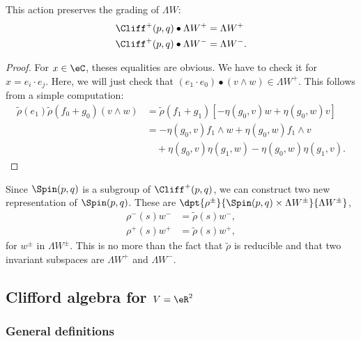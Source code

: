 \begin{proposition}
This action preserves the grading of $\Lambda W $:
\begin{equation}
\begin{split}
 \Cliff^+(p,q)\bullet\Lambda W^+&=\Lambda W^+\\
 \Cliff^+(p,q)\bullet\Lambda W^-&=\Lambda W^-.
\end{split}
\end{equation}

\end{proposition}
\begin{proof}
For $x\in\eC$, theses equalities are obvious. We have to check it for $x=e_i\cdot e_j$. Here, we will just check that $(e_1\cdot e_0)\bullet(v\wedge w)\in\Lambda W^+$. This follows from a simple computation:
\begin{equation}
\begin{split}
\tilde\rho(e_1)\tilde\rho(f_0+g_0)(v\wedge w)&=
                         \tilde\rho(f_1+g_1)\left[-\eta(g_0,v)w+\eta(g_0,w)v\right]\\
                    &=-\eta(g_0,v)f_1\wedge w+\eta(g_0,w)f_1\wedge v\\
                    &\quad+\eta(g_0,v)\eta(g_1,w)-\eta(g_0,w)\eta(g_1,v).
\end{split}
\end{equation}
\end{proof}

Since $\Spin(p,q)$ is a subgroup of $\Cliff^+(p,q)$, we can construct two new representation of $\Spin(p,q)$. These are $\dpt{\rho^{\pm}}{\Spin(p,q)\times\Lambda W ^{\pm}}{\Lambda W ^{\pm}}$,
\begin{equation}
\begin{split}
 \rho^-(s)w^-&=\tilde\rho(s)w^-,\\
 \rho^+(s)w^+&=\tilde\rho(s)w^+,
\end{split}
\end{equation}
for $w^{\pm}$ in $\Lambda W ^{\pm}$. This is no more than the fact that $\tilde\rho$ is reducible and that two invariant subspaces are $\Lambda W^+$ and $\Lambda W^-$.
\subsection{Clifford algebra for \texorpdfstring{$V=\eR^2$}{V=R2}}\label{cliffR2}

\subsubsection{General definitions}

